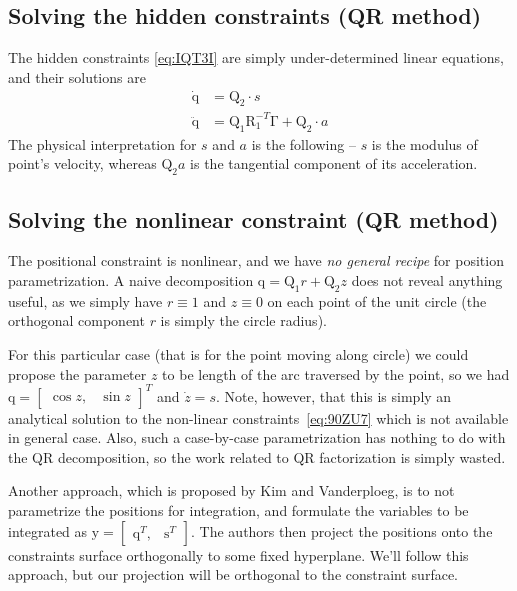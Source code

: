 \documentclass{scrartcl}
\newcommand\mMat[1]{\ensuremath{\boldsymbol{\mathrm{#1}}}}
\newcommand\mVec[1]{\ensuremath{\boldsymbol{\mathrm{#1}}}}
\begin{document}
\subsection{Solving the hidden constraints (QR method)}

The hidden constraints \eqref{eq:IQT3I} are simply under-determined linear
equations, and their solutions are
\begin{align}
  \mVec{\dot q}   & = \mMat{Q}_2 \cdot s
  \label{eq:38DY7}
  \\
  \mVec{\ddot q}  & = \mMat{Q}_1 \mMat{R}_1^{-T} \mVec{\Gamma}
                    + \mMat{Q}_2 \cdot a
  \label{eq:EKLKN}
\end{align}
The physical interpretation for $s$ and $a$ is the following -- $s$ is the
modulus of point's velocity, whereas $\mMat{Q}_2 a$ is the tangential component
of its acceleration.

\subsection{Solving the nonlinear constraint (QR method)}

The positional constraint is nonlinear, and we have \textit{no general recipe}
for position parametrization. A naive decomposition $\mVec{q} = \mMat{Q}_1 r +
\mMat{Q}_2 z$ does not reveal anything useful, as we simply have $r \equiv 1$
and $z \equiv 0$ on each point of the unit circle (the orthogonal component $r$
is simply the circle radius).

For this particular case (that is for the point moving along circle) we could
propose the parameter $z$ to be length of the arc traversed by the point, so we
had $\mVec{q} = \begin{bmatrix} \cos{z}, & \sin{z} \end{bmatrix}^T$
and ${\dot z} = s$. Note, however, that this is simply an analytical solution
to the non-linear constraints~\eqref{eq:90ZU7} which is not available in
general case. Also, such a case-by-case parametrization has nothing to do with
the QR decomposition, so the work related to QR factorization is simply wasted.

Another approach, which is proposed by Kim and Vanderploeg, is to not
para\-me\-tri\-ze the positions for integration, and formulate the variables to
be integrated as $\mVec{y} = \begin{bmatrix} \mVec{q}^T, & \mVec{s}^T
\end{bmatrix}$. The authors then project the positions onto the constraints
surface orthogonally to some fixed hyperplane. We'll follow this approach, but
our projection will be orthogonal to the constraint surface.
\end{document}
